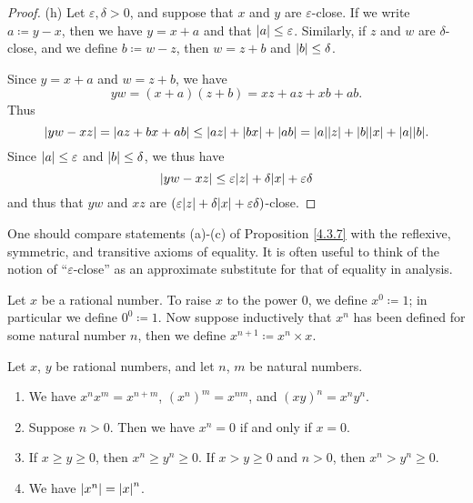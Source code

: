 \begin{proof}{(h)}
    Let \(\varepsilon, \delta > 0\), and suppose that \(x\) and \(y\) are \(\varepsilon\)-close.
    If we write \(a \coloneqq y - x\), then we have \(y = x + a\) and that \(\abs*{a} \leq \varepsilon\).
    Similarly, if \(z\) and \(w\) are \(\delta\)-close, and we define \(b \coloneqq w - z\), then \(w = z + b\) and \(\abs*{b} \leq \delta\).

    Since \(y = x + a\) and \(w = z + b\), we have
    \[
        yw = (x + a)(z + b) = xz + az + xb + ab.
    \]
    Thus
    \[
        \abs*{yw - xz} = \abs*{az + bx + ab} \leq \abs*{az} + \abs*{bx} + \abs*{ab} = \abs*{a}\abs*{z} + \abs*{b}\abs*{x} + \abs*{a}\abs*{b}.
    \]
    Since \(\abs*{a} \leq \varepsilon\) and \(\abs*{b} \leq \delta\), we thus have
    \[
        \abs*{yw - xz} \leq \varepsilon\abs*{z} + \delta\abs*{x} + \varepsilon\delta
    \]
    and thus that \(yw\) and \(xz\) are \((\varepsilon\abs*{z} + \delta\abs*{x} + \varepsilon\delta)\)-close.
\end{proof}

\begin{remark}\label{4.3.8}
    One should compare statements (a)-(c) of Proposition \ref{4.3.7} with the reflexive, symmetric, and transitive axioms of equality.
    It is often useful to think of the notion of ``\(\varepsilon\)-close'' as an approximate substitute for that of equality in analysis.
\end{remark}

\begin{definition}\label{4.3.9}
    Let \(x\) be a rational number.
    To raise \(x\) to the power \(0\), we define \(x^0 \coloneqq 1\);
    in particular we define \(0^0 \coloneqq 1\).
    Now suppose inductively that \(x^n\) has been defined for some natural number \(n\), then we define \(x^{n+1} \coloneqq x^n \times x\).
\end{definition}

\begin{proposition}\label{4.3.10}
    Let \(x\), \(y\) be rational numbers, and let \(n\), \(m\) be natural numbers.
    \begin{enumerate}
        \item We have \(x^n x^m = x^{n + m}\), \((x^n)^m = x^{nm}\), and \((xy)^n = x^n y^n\).
        \item Suppose \(n > 0\).
              Then we have \(x^n = 0\) if and only if \(x = 0\).
        \item If \(x \geq y \geq 0\), then \(x^n \geq y^n \geq 0\).
              If \(x > y \geq 0\) and \(n > 0\), then \(x^n > y^n \geq 0\).
        \item We have \(\abs*{x^n} = \abs*{x}^n\).
    \end{enumerate}
\end{proposition}

